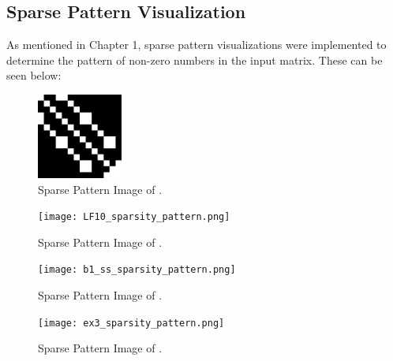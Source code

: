 \documentclass[12pt]{article}
\begin{document}
\subsection{Sparse Pattern Visualization}

As mentioned in Chapter 1, sparse pattern visualizations were implemented to determine the pattern of non-zero numbers in the input matrix. These can be seen below:

\begin{figure}[h]
  \centering
  \includegraphics[width=0.25\textwidth]{LFAT5_sparsity_pattern.png}
  \caption{Sparse Pattern Image of .}
  \label{fig:your_image}
\end{figure}

\begin{figure}[h]
  \centering
  \texttt{[image: LF10\_sparsity\_pattern.png]}
  \caption{Sparse Pattern Image of .}
  \label{fig:your_image}
\end{figure}

\begin{figure}[h]
  \centering
  \texttt{[image: b1\_ss\_sparsity\_pattern.png]}
  \caption{Sparse Pattern Image of .}
  \label{fig:your_image}
\end{figure}

\begin{figure}[h]
  \centering
  \texttt{[image: ex3\_sparsity\_pattern.png]}
  \caption{Sparse Pattern Image of .}
  \label{fig:your_image}
\end{figure}
\end{document}
